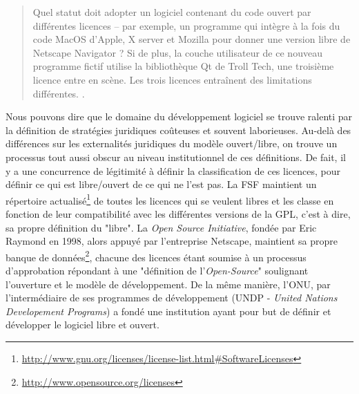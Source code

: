 \begin{quote}
Quel statut doit adopter un logiciel contenant du code ouvert par différentes licences – par exemple, un programme qui intègre à la fois du code MacOS d'Apple, X server et Mozilla pour donner une version libre de Netscape Navigator ? Si de plus, la couche utilisateur de ce nouveau programme fictif utilise la bibliothèque Qt de Troll Tech, une troisième licence entre en scène. Les trois licences entraînent des limitations différentes. \citep[p.16]{Muller2001}.
\end{quote}

Nous pouvons dire que le domaine du développement logiciel se trouve ralenti par la définition de stratégies juridiques coûteuses et souvent laborieuses. Au-delà des différences sur les externalités juridiques du modèle ouvert/libre, on trouve un processus tout aussi obscur au niveau institutionnel de ces définitions. De fait, il y a une concurrence de légitimité à définir la classification de ces licences, pour définir ce qui est libre/ouvert de ce qui ne l'est pas. La FSF maintient un répertoire actualisé\footnote{\url{http://www.gnu.org/licenses/license-list.html#SoftwareLicenses}} de toutes les licences qui se veulent libres et les classe en fonction de leur compatibilité avec les différentes versions de la GPL, c'est à dire, sa propre définition du "libre". La \emph{Open Source Initiative}, fondée par Eric Raymond en 1998, alors appuyé par l'entreprise Netscape, maintient sa propre banque de données\footnote{\url{http://www.opensource.org/licenses}}, chacune des licences étant soumise à un processus d'approbation répondant à une "définition de l'\emph{Open-Source}" soulignant l'ouverture et le modèle de développement. De la même manière, l'ONU, par l'intermédiaire de ses programmes de développement (UNDP - \emph{United Nations Developement Programs}) a fondé une institution ayant pour but de définir et développer le logiciel libre et ouvert.


